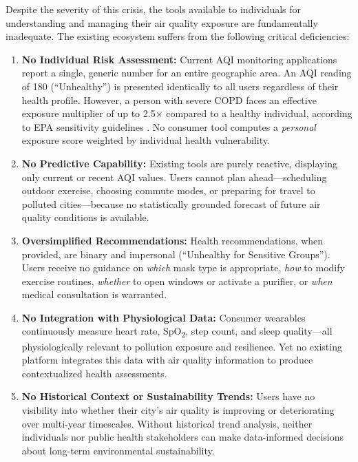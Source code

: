 \documentclass[12pt,a4paper]{report}
\begin{document}
Despite the severity of this crisis, the tools available to individuals for understanding and managing their air quality exposure are fundamentally inadequate. The existing ecosystem suffers from the following critical deficiencies:

\begin{enumerate}[leftmargin=*]
  \item \textbf{No Individual Risk Assessment:} Current AQI monitoring applications report a single, generic number for an entire geographic area. An AQI reading of 180 (``Unhealthy'') is presented identically to all users regardless of their health profile. However, a person with severe COPD faces an effective exposure multiplier of up to 2.5$\times$ compared to a healthy individual, according to EPA sensitivity guidelines \cite{EPA2024healtheffects}. No consumer tool computes a \textit{personal} exposure score weighted by individual health vulnerability.

  \item \textbf{No Predictive Capability:} Existing tools are purely reactive, displaying only current or recent AQI values. Users cannot plan ahead---scheduling outdoor exercise, choosing commute modes, or preparing for travel to polluted cities---because no statistically grounded forecast of future air quality conditions is available.

  \item \textbf{Oversimplified Recommendations:} Health recommendations, when provided, are binary and impersonal (``Unhealthy for Sensitive Groups''). Users receive no guidance on \textit{which} mask type is appropriate, \textit{how} to modify exercise routines, \textit{whether} to open windows or activate a purifier, or \textit{when} medical consultation is warranted.

  \item \textbf{No Integration with Physiological Data:} Consumer wearables continuously measure heart rate, SpO\textsubscript{2}, step count, and sleep quality---all physiologically relevant to pollution exposure and resilience. Yet no existing platform integrates this data with air quality information to produce contextualized health assessments.

  \item \textbf{No Historical Context or Sustainability Trends:} Users have no visibility into whether their city's air quality is improving or deteriorating over multi-year timescales. Without historical trend analysis, neither individuals nor public health stakeholders can make data-informed decisions about long-term environmental sustainability.
\end{enumerate}
\end{document}
